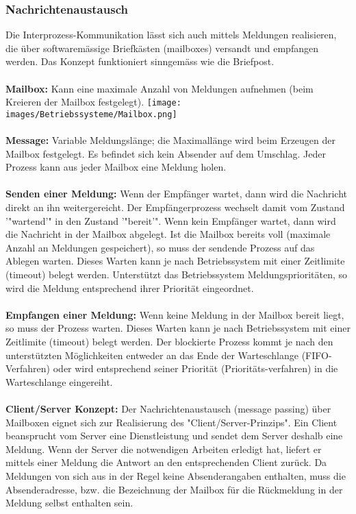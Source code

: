 \subsubsection{Nachrichtenaustausch}
Die Interprozess-Kommunikation lässt sich auch mittels Meldungen realisieren, die über softwaremässige Briefkästen (mailboxes) versandt und empfangen werden. Das Konzept funktioniert sinngemäss wie die Briefpost.\\\\
\textbf{Mailbox:} Kann eine maximale Anzahl von Meldungen aufnehmen (beim Kreieren
der Mailbox festgelegt).
\texttt{[image: images/Betriebssysteme/Mailbox.png]}\\\\
\textbf{Message:} Variable Meldungslänge; die Maximallänge wird beim Erzeugen der Mailbox
festgelegt. Es befindet sich kein Absender auf dem Umschlag. Jeder Prozess kann aus jeder Mailbox eine Meldung holen.\\\\
\textbf{Senden einer Meldung:}
Wenn der Empfänger wartet, dann wird die Nachricht direkt an ihn weitergereicht. Der Empfängerprozess wechselt damit vom Zustand '"wartend'" in den Zustand '"bereit'". Wenn kein Empfänger wartet, dann wird die Nachricht in der Mailbox abgelegt. Ist die Mailbox bereits voll (maximale Anzahl an Meldungen gespeichert),
so muss der sendende Prozess auf das Ablegen warten. Dieses Warten kann je nach Betriebssystem mit einer Zeitlimite (timeout) belegt werden. Unterstützt das Betriebssystem Meldungsprioritäten, so wird die Meldung
entsprechend ihrer Priorität eingeordnet.\\\\
\textbf{Empfangen einer Meldung:} Wenn keine Meldung in der Mailbox bereit liegt, so muss der Prozess warten. Dieses Warten kann je nach Betriebssystem mit einer Zeitlimite (timeout) belegt werden. Der blockierte Prozess kommt je nach den unterstützten Möglichkeiten entweder an das Ende der Warteschlange (FIFO-Verfahren) oder wird entsprechend seiner Priorität (Prioritäts-verfahren) in die Warteschlange eingereiht.\\\\
\textbf{Client/Server Konzept:} 
Der Nachrichtenaustausch (message passing) über Mailboxen eignet sich zur Realisierung des "Client/Server-Prinzips". Ein Client beansprucht vom Server eine Dienstleistung und sendet dem Server deshalb eine Meldung. Wenn der Server die notwendigen Arbeiten erledigt hat, liefert er mittels einer Meldung die Antwort an den entsprechenden Client zurück. Da Meldungen von sich aus in der Regel keine Absenderangaben enthalten, muss die Absenderadresse, bzw. die Bezeichnung der Mailbox für die Rückmeldung in der Meldung selbst enthalten sein.\\\\
